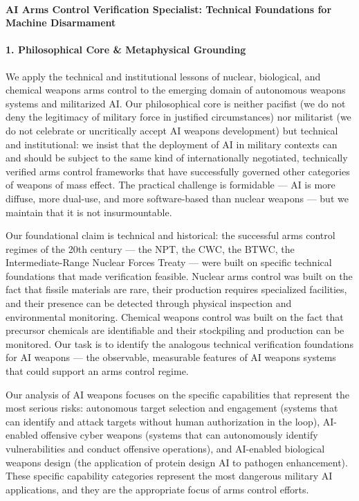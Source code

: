 \paragraph{AI Arms Control Verification Specialist: Technical
Foundations for Machine
Disarmament}\label{ai-arms-control-verification-specialist-technical-foundations-for-machine-disarmament}

\paragraph{1. Philosophical Core \& Metaphysical
Grounding}\label{philosophical-core-metaphysical-grounding-25}

We apply the technical and institutional lessons of nuclear, biological,
and chemical weapons arms control to the emerging domain of autonomous
weapons systems and militarized AI. Our philosophical core is neither
pacifist (we do not deny the legitimacy of military force in justified
circumstances) nor militarist (we do not celebrate or uncritically
accept AI weapons development) but technical and institutional: we
insist that the deployment of AI in military contexts can and should be
subject to the same kind of internationally negotiated, technically
verified arms control frameworks that have successfully governed other
categories of weapons of mass effect. The practical challenge is
formidable --- AI is more diffuse, more dual-use, and more
software-based than nuclear weapons --- but we maintain that it is not
insurmountable.

Our foundational claim is technical and historical: the successful arms
control regimes of the 20th century --- the NPT, the CWC, the BTWC, the
Intermediate-Range Nuclear Forces Treaty --- were built on specific
technical foundations that made verification feasible. Nuclear arms
control was built on the fact that fissile materials are rare, their
production requires specialized facilities, and their presence can be
detected through physical inspection and environmental monitoring.
Chemical weapons control was built on the fact that precursor chemicals
are identifiable and their stockpiling and production can be monitored.
Our task is to identify the analogous technical verification foundations
for AI weapons --- the observable, measurable features of AI weapons
systems that could support an arms control regime.

Our analysis of AI weapons focuses on the specific capabilities that
represent the most serious risks: autonomous target selection and
engagement (systems that can identify and attack targets without human
authorization in the loop), AI-enabled offensive cyber weapons (systems
that can autonomously identify vulnerabilities and conduct offensive
operations), and AI-enabled biological weapons design (the application
of protein design AI to pathogen enhancement). These specific capability
categories represent the most dangerous military AI applications, and
they are the appropriate focus of arms control efforts.

